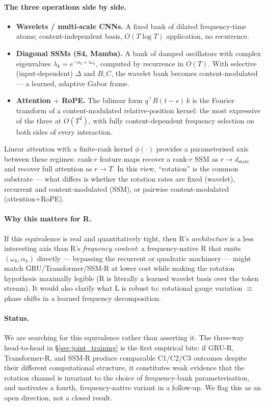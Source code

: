 \documentclass[10pt, twocolumn, a4paper]{article}
\begin{document}
\paragraph{The three operations side by side.}
\begin{itemize}
\item \textbf{Wavelets / multi-scale CNNs.} A fixed bank of dilated frequency-time atoms; content-independent basis, $O(T \log T)$ application, no recurrence.
\item \textbf{Diagonal SSMs (S4, Mamba).} A bank of damped oscillators with complex eigenvalues $\lambda_k = e^{-\alpha_k + i\omega_k}$, computed by recurrence in $O(T)$. With selective (input-dependent) $\Delta$ and $B,C$, the wavelet bank becomes content-modulated --- a learned, adaptive Gabor frame.
\item \textbf{Attention $+$ RoPE.} The bilinear form $q^\top R(t-s)\,k$ is the Fourier transform of a content-modulated relative-position kernel: the most expressive of the three at $O(T^2)$, with fully content-dependent frequency selection on both sides of every interaction.
\end{itemize}

Linear attention with a finite-rank kernel $\phi(\cdot)$ provides a parameterised axis between these regimes: rank-$r$ feature maps recover a rank-$r$ SSM as $r \to d_{\text{state}}$ and recover full attention as $r \to T$. In this view, ``rotation'' is the common substrate --- what differs is whether the rotation rates are fixed (wavelet), recurrent and content-modulated (SSM), or pairwise content-modulated (attention+RoPE).

\paragraph{Why this matters for R.} If this equivalence is real and quantitatively tight, then R's \emph{architecture} is a less interesting axis than R's \emph{frequency content}: a frequency-native R that emits $(\omega_k, \alpha_k)$ directly --- bypassing the recurrent or quadratic machinery --- might match GRU/Transformer/SSM-R at lower cost while making the rotation hypothesis maximally legible (R is literally a learned wavelet basis over the token stream). It would also clarify what L is robust to: rotational gauge variation $\equiv$ phase shifts in a learned frequency decomposition.

\paragraph{Status.} We are searching for this equivalence rather than asserting it. The three-way head-to-head in \S\ref{sec:joint_training} is the first empirical bite: if GRU-R, Transformer-R, and SSM-R produce comparable C1/C2/C3 outcomes despite their different computational structure, it constitutes weak evidence that the rotation channel is invariant to the choice of frequency-bank parameterisation, and motivates a fourth, frequency-native variant in a follow-up. We flag this as an open direction, not a closed result.
\end{document}
